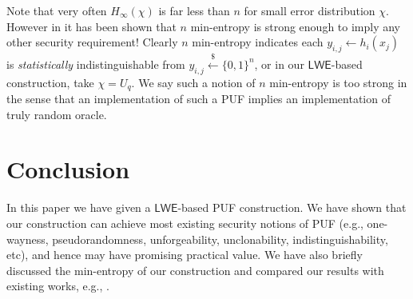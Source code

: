\documentclass[12pt]{article}
\newcommand{\bits}{\{0,1\}}
\newcommand{\getsr}{\stackrel{\$}{\gets}}
\newcommand{\LWE}{\mathsf{LWE}}
\theoremstyle{definition}
\begin{document}
Note that very often $H_{\infty}(\chi)$ is far less than $n$ for small error distribution $\chi$. However in \cite{sadeghi2016towards} it has been shown that $n$ min-entropy is strong enough to imply any other security requirement! Clearly $n$ min-entropy indicates each $y_{i,j} \gets h_i(x_j)$ is \emph{statistically} indistinguishable from $y_{i,j} \getsr \bits^n$, or in our $\LWE$-based construction, take $\chi = U_q$. We say such a notion of $n$ min-entropy is too strong in the sense that an implementation of such a PUF implies an implementation of truly random oracle.

\section{Conclusion}
In this paper we have given a $\LWE$-based PUF construction. We have shown that our construction can achieve most existing security notions of PUF (e.g., one-wayness, pseudorandomness, unforgeability, unclonability, indistinguishability, etc), and hence may have promising practical value. We have also briefly discussed the min-entropy of our construction and compared our results with existing works, e.g., \cite{sadeghi2016towards}.



	
\end{document}

